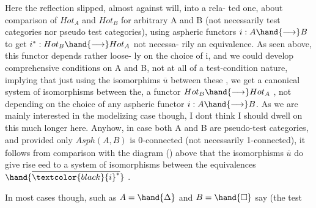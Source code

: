 \hand{\uline{\textcolor{black}{Remark}}} Here the reflection slipped, almost against will, into a rela-%
ted one, about comparison of $Hot_{A}$ and $Hot_{B}$ for arbitrary A and B
(not necessarily test categories nor \hand{\uline{\textcolor{black}{even}}} pseudo test categories), using
aspheric functors $i: A \hand{\longrightarrow} B$ to get $i^{*} : Hot_{B}\hand{\longrightarrow}Hot_{A}$ \over{,}{(} not necessa-%
rily an equivalence\hand{)}. As seen above, this functor depends rather loose-%
ly on the choice of i, and  we could develop comprehensive conditions
on A and B, not  at all of a test-condition nature, implying that
 just using the isomorphims $\overline{u}$ between these , we get a canonical
\hand{\uline{\textcolor{black}{transitive}}} system of isomorphisms between the,   a \hand{\uline{\textcolor{black}{canonical}}}
functor $Hot_{B}\hand{\longrightarrow}Hot_{A}$ , not depending on the  choice of any aspheric
functor $i: A\hand{\longrightarrow} B$. As we are mainly interested in the modelizing case
though, I dont think I should dwell on this much longer here. Anyhow,
in case both A and B are pseudo-test categories, and provided only
$\underline{Asph}(A,B)$ is 0-connected (not necessarily 1-connected), it follows 
 from comparison with the diagram () above that the isomorphisms $\overline{u}$
do give rise \hand{\uline{\textcolor{black}{ind}}}eed to a \hand{\uline{\textcolor{black}{transitive}}} system of isomorphisms between the
equivalences $\hand{\overline{\textcolor{black}{i}^{*}}}$ .

In most cases though, such as $A =\hand{\Delta}$ and $B =\hand{\Box}$ say (the test

